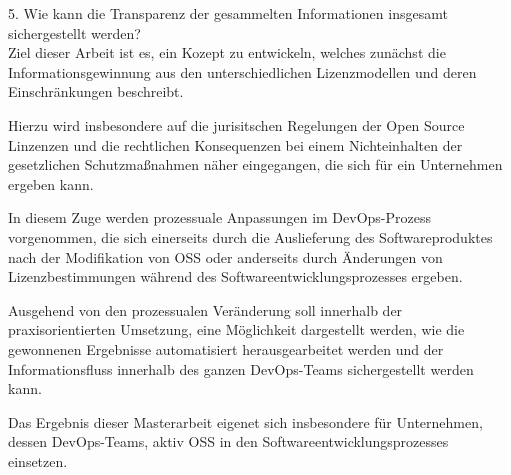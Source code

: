 

5. Wie kann die Transparenz der gesammelten Informationen insgesamt sichergestellt werden?\\ 


Ziel dieser Arbeit ist es, ein Kozept zu entwickeln, welches zunächst die Informationsgewinnung aus den unterschiedlichen Lizenzmodellen und deren Einschränkungen beschreibt. 

Hierzu wird insbesondere auf die jurisitschen Regelungen der Open Source Linzenzen und die rechtlichen Konsequenzen bei einem Nichteinhalten der gesetzlichen Schutzmaßnahmen näher eingegangen, die sich für ein Unternehmen ergeben kann.

In diesem Zuge werden prozessuale Anpassungen im DevOps-Prozess vorgenommen, die sich einerseits durch die Auslieferung des Softwareproduktes nach der Modifikation von OSS oder anderseits durch Änderungen von Lizenzbestimmungen während des Softwareentwicklungsprozesses ergeben. 

Ausgehend von den prozessualen Veränderung soll innerhalb der praxisorientierten Umsetzung, eine Möglichkeit dargestellt werden, wie die gewonnenen Ergebnisse automatisiert herausgearbeitet werden und der Informationsfluss innerhalb des ganzen DevOps-Teams sichergestellt werden kann. 

Das Ergebnis dieser Masterarbeit eigenet sich insbesondere für Unternehmen, dessen DevOps-Teams, aktiv OSS in den Softwareentwicklungsprozesses einsetzen. 
 